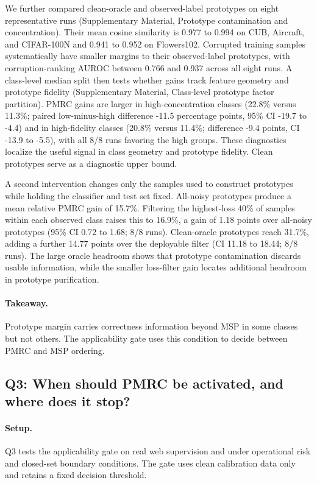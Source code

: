 \documentclass[review,times]{elsarticle}
\begin{document}
We further compared clean-oracle and observed-label prototypes on eight representative runs (Supplementary Material, Prototype contamination and concentration). Their mean cosine similarity is 0.977 to 0.994 on CUB, Aircraft, and CIFAR-100N and 0.941 to 0.952 on Flowers102. Corrupted training samples systematically have smaller margins to their observed-label prototypes, with corruption-ranking AUROC between 0.766 and 0.937 across all eight runs. A class-level median split then tests whether gains track feature geometry and prototype fidelity (Supplementary Material, Class-level prototype factor partition). PMRC gains are larger in high-concentration classes (22.8\% versus 11.3\%; paired low-minus-high difference -11.5 percentage points, 95\% CI -19.7 to -4.4) and in high-fidelity classes (20.8\% versus 11.4\%; difference -9.4 points, CI -13.9 to -5.5), with all 8/8 runs favoring the high groups. These diagnostics localize the useful signal in class geometry and prototype fidelity. Clean prototypes serve as a diagnostic upper bound.

A second intervention changes only the samples used to construct prototypes while holding the classifier and test set fixed. All-noisy prototypes produce a mean relative PMRC gain of 15.7\%. Filtering the highest-loss 40\% of samples within each observed class raises this to 16.9\%, a gain of 1.18 points over all-noisy prototypes (95\% CI 0.72 to 1.68; 8/8 runs). Clean-oracle prototypes reach 31.7\%, adding a further 14.77 points over the deployable filter (CI 11.18 to 18.44; 8/8 runs). The large oracle headroom shows that prototype contamination discards usable information, while the smaller loss-filter gain locates additional headroom in prototype purification.

\paragraph{Takeaway.} Prototype margin carries correctness information beyond MSP in some classes but not others. The applicability gate uses this condition to decide between PMRC and MSP ordering.

\subsection{Q3: When should PMRC be activated, and where does it stop?}

\paragraph{Setup.} Q3 tests the applicability gate on real web supervision and under operational risk and closed-set boundary conditions. The gate uses clean calibration data only and retains a fixed decision threshold.
\end{document}
